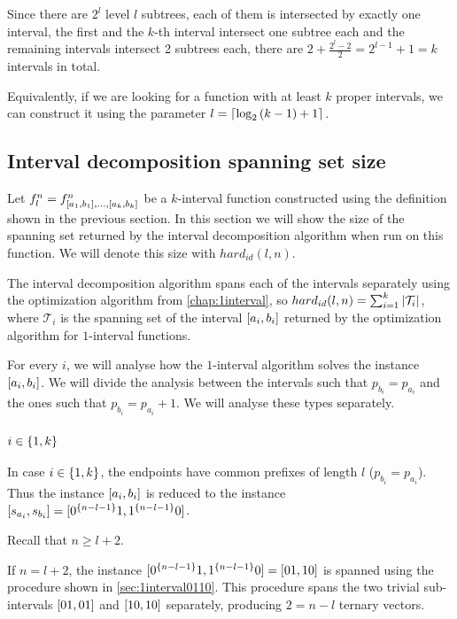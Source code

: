 Since there are $2^l$ level $l$ subtrees,
each of them is intersected by exactly one interval,
the first and the $k$-th interval intersect
one subtree each
and the remaining intervals intersect 2 subtrees each,
there are $2 + \frac{2^l - 2}{2} = 2^{l-1} + 1 = k$
intervals in total.

Equivalently,
if we are looking for a  function
with at least $k$ proper intervals,
we can construct it using the parameter
$l = \lceil\log_2{(k-1)} + 1\rceil$.

\subsection{Interval decomposition spanning set size}

Let $f_l^n =
f^n_{[a_1, b_1], \ldots, [a_k, b_k]}$
be a $k$-interval function
constructed using the definition
shown in the previous section.
In this section we will show the size of the spanning set
returned by the interval decomposition algorithm
when run on this function.
We will denote this size with $hard_{id}(l, n)$.

The interval decomposition algorithm spans
each of the intervals separately
using the optimization algorithm
from \autoref{chap:1interval},
so $hard_{id}(l, n) = \sum_{i=1}^k{\lvert\mathcal{T}_i\rvert}$,
where $\mathcal{T}_i$ is the spanning set
of the interval $[a_i, b_i]$
returned by the optimization algorithm
for $1$-interval functions.

For every $i$,
we will analyse how the $1$-interval algorithm solves
the instance $[a_i, b_i]$.
We will divide the analysis between the intervals
such that $p_{b_i} = p_{a_i}$
and the ones such that $p_{b_i} = p_{a_i} + 1$.
We will analyse these types separately.

\subsubsection{$i \in \{1, k\}$}

In case $i \in \{1, k\}$,
the endpoints have common prefixes of length $l$
($p_{b_i} = p_{a_i}$).
Thus the instance $[a_i, b_i]$
is reduced to the instance
$[s_{a_i}, s_{b_i}]
= [0^{\{n-l-1\}} 1, 1^{\{n-l-1\}} 0]$.

Recall that $n \geq l + 2$.

If $n = l + 2$,
the instance
$[0^{\{n-l-1\}} 1, 1^{\{n-l-1\}} 0]
= [01, 10]$
is spanned using the procedure
shown in \autoref{sec:1interval0110}.
This procedure spans the two trivial sub-intervals
$[01, 01]$ and $[10, 10]$
separately,
producing $2 = n-l$ ternary vectors.

